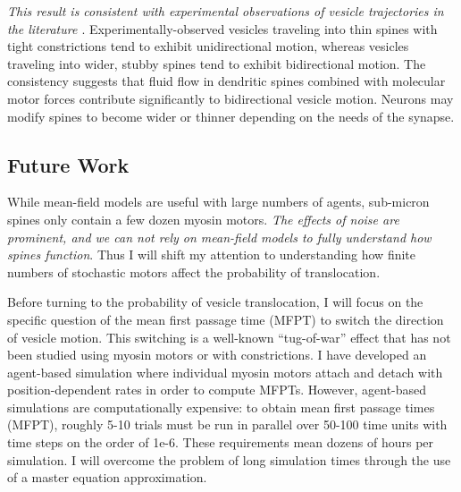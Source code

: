 \documentclass[a4paper,11pt]{article}
\begin{document}
\textit{This result is consistent with experimental observations of vesicle trajectories in the literature \cite{park2020dynamics}}. Experimentally-observed vesicles traveling into thin spines with tight constrictions tend to exhibit unidirectional motion, whereas vesicles traveling into wider, stubby spines tend to exhibit bidirectional motion. The consistency suggests that fluid flow in dendritic spines combined with molecular motor forces contribute significantly to bidirectional vesicle motion. Neurons may modify spines to become wider or thinner depending on the needs of the synapse.

\subsection{Future Work}
While mean-field models are useful with large numbers of agents, sub-micron spines only contain a few dozen myosin motors. \textit{The effects of noise are prominent, and we can not rely on mean-field models to fully understand how spines function}. Thus I will shift my attention to understanding how finite numbers of stochastic motors affect the probability of translocation.

Before turning to the probability of vesicle translocation, I will focus on the specific question of the mean first passage time (MFPT) to switch the direction of vesicle motion. This switching is a well-known ``tug-of-war'' effect \cite{julicher1995cooperative} that has not been studied using myosin motors or with constrictions. I have developed an agent-based simulation where individual myosin motors attach and detach with position-dependent rates in order to compute MFPTs. However, agent-based simulations are computationally expensive: to obtain mean first passage times (MFPT), roughly 5-10 trials must be run in parallel over 50-100 time units with time steps on the order of 1e-6. These requirements mean dozens of hours per simulation. I will overcome the problem of long simulation times through the use of a master equation approximation.


\end{document}
